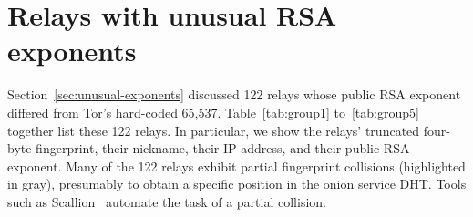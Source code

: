 \appendix

\section{Relays with unusual RSA exponents}
\label{sec:full-unusual-exponents}
Section~\ref{sec:unusual-exponents} discussed 122 relays whose public RSA
exponent differed from Tor's hard-coded 65,537.  Table~\ref{tab:group1}
to~\ref{tab:group5} together list these 122 relays.  In particular, we show the
relays' truncated four-byte fingerprint, their nickname, their IP address, and
their public RSA exponent.  Many of the 122 relays exhibit partial fingerprint
collisions (highlighted in gray), presumably to obtain a specific position in
the onion service DHT.  Tools such as Scallion~\cite{scallion} automate
the task of a partial collision.

